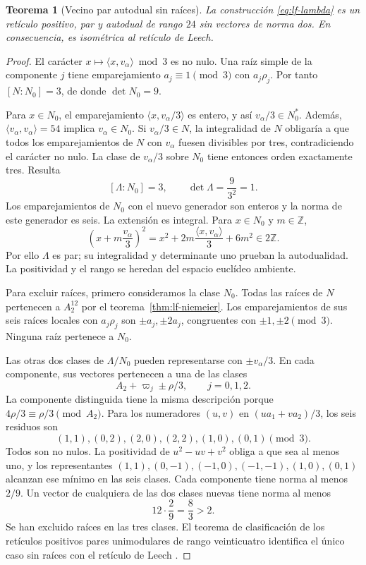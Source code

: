 \documentclass[a4paper,10pt]{article}
\newtheorem{theorem}{Teorema}[section]
\theoremstyle{definition}\newtheorem{definition}[theorem]{Definición}
\theoremstyle{remark}\newtheorem{remark}[theorem]{Observación}
\numberwithin{equation}{section}
\begin{document}
\begin{theorem}[Vecino par autodual sin raíces]
\label{thm:lf-leech}
La construcción \eqref{eq:lf-lambda} es un
retículo positivo, par y autodual de rango \(24\)
sin vectores de norma dos. En consecuencia, es
isométrica al retículo de Leech.
\end{theorem}
\begin{proof}
El carácter \(x\mapsto\langle x,v_\alpha\rangle\bmod3\)
es no nulo. Una raíz simple de la componente \(j\)
tiene emparejamiento \(a_j\equiv1\pmod3\) con
\(a_j\rho_j\). Por tanto \([N:N_0]=3\), de donde
\(\det N_0=9\).

Para \(x\in N_0\), el emparejamiento
\(\langle x,v_\alpha/3\rangle\) es entero, y así
\(v_\alpha/3\in N_0^*\). Además,
\(\langle v_\alpha,v_\alpha\rangle=54\) implica
\(v_\alpha\in N_0\). Si \(v_\alpha/3\in N\),
la integralidad de \(N\) obligaría a que todos los
emparejamientos de \(N\) con \(v_\alpha\) fuesen
divisibles por tres, contradiciendo el carácter
no nulo. La clase de \(v_\alpha/3\) sobre \(N_0\)
tiene entonces orden exactamente tres. Resulta
\[
 [\Lambda:N_0]=3,\qquad
 \det\Lambda=\frac9{3^2}=1.
\]
Los emparejamientos de \(N_0\) con el nuevo
generador son enteros y la norma de este generador
es seis. La extensión es integral. Para
\(x\in N_0\) y \(m\in\mathbb Z\),
\[
 \left(x+m\frac{v_\alpha}{3}\right)^2
 =x^2+2m\frac{\langle x,v_\alpha\rangle}{3}
       +6m^2\in2\mathbb Z.
\]
Por ello \(\Lambda\) es par; su integralidad y
determinante uno prueban la autodualidad.
La positividad y el rango se heredan del espacio
euclídeo ambiente.

Para excluir raíces, primero consideramos la
clase \(N_0\). Todas las raíces de \(N\) pertenecen
a \(A_2^{12}\) por el teorema~\ref{thm:lf-niemeier}.
Los emparejamientos de sus seis raíces locales
con \(a_j\rho_j\) son \(\pm a_j,\pm2a_j\),
congruentes con \(\pm1,\pm2\pmod3\).
Ninguna raíz pertenece a \(N_0\).

Las otras dos clases de \(\Lambda/N_0\) pueden
representarse con \(\pm v_\alpha/3\).
En cada componente, sus vectores pertenecen a
una de las clases
\[
 A_2+\varpi_j\pm\rho/3,\qquad j=0,1,2.
\]
La componente distinguida tiene la misma
descripción porque \(4\rho/3\equiv\rho/3\pmod{A_2}\).
Para los numeradores \((u,v)\) en
\((ua_1+va_2)/3\), los seis residuos son
\[
 (1,1),(0,2),(2,0),(2,2),(1,0),(0,1)\pmod3.
\]
Todos son no nulos. La positividad de
\(u^2-uv+v^2\) obliga a que sea al menos uno,
y los representantes
\((1,1),(0,-1),(-1,0),(-1,-1),(1,0),(0,1)\)
alcanzan ese mínimo en las seis clases.
Cada componente tiene norma al menos \(2/9\).
Un vector de cualquiera de las dos clases
nuevas tiene norma al menos
\[
 12\cdot\frac29=\frac83>2.
\]
Se han excluido raíces en las tres clases.
El teorema de clasificación de los retículos
positivos pares unimodulares de rango veinticuatro
identifica el único caso sin raíces con el
retículo de Leech \cite{ConwaySloane}.
\end{proof}
\end{document}
